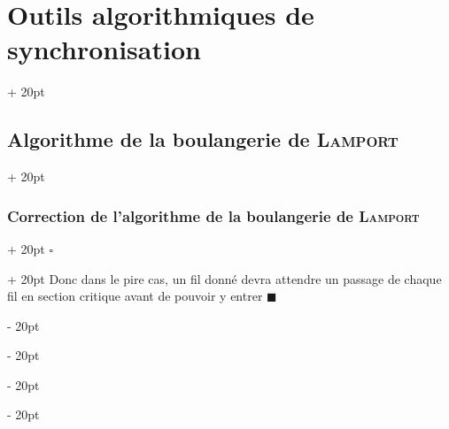\documentclass[a4paper, 12pt, twoside]{article}
\newcommand{\ind}[1][20pt]{\advance\leftskip + #1}
\newcommand{\deind}[1][20pt]{\advance\leftskip - #1}
\newenvironment{indt}[2][20pt]{#2 \par \ind[#1]}{\par \deind} %
\newenvironment{proof}[1][{}]{\begin{indt}{$\square$ #1}}{$\blacksquare$ \end{indt}}
\begin{document}
\begin{indt}{\section{Outils algorithmiques de synchronisation}}
\begin{indt}{\subsection{Algorithme de la boulangerie de \textsc{Lamport}}}
\begin{indt}{\subsubsection{Correction de l'algorithme de la boulangerie de \textsc{Lamport}}}
\begin{proof}
                    Donc dans le pire cas, un fil donné devra attendre un passage de chaque fil en section critique avant de pouvoir y entrer
                \end{proof}
            \end{indt}
        \end{indt}
    \end{indt}
    
    
    
\end{document}
